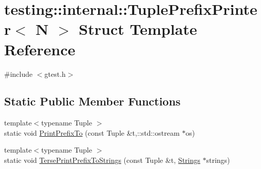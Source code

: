 \hypertarget{structtesting_1_1internal_1_1_tuple_prefix_printer}{\section{testing\-:\-:internal\-:\-:Tuple\-Prefix\-Printer$<$ N $>$ Struct Template Reference}
\label{structtesting_1_1internal_1_1_tuple_prefix_printer}
}


{\ttfamily \#include $<$gtest.\-h$>$}

\subsection*{Static Public Member Functions}
\begin{DoxyCompactItemize}
\item 
{\footnotesize template$<$typename Tuple $>$ }\\static void \hyperlink{structtesting_1_1internal_1_1_tuple_prefix_printer_ac8ea4f0f2604937a1e40370ef83d9d1b}{Print\-Prefix\-To} (const Tuple \&t,\-::std\-::ostream $\ast$os)
\item 
{\footnotesize template$<$typename Tuple $>$ }\\static void \hyperlink{structtesting_1_1internal_1_1_tuple_prefix_printer_afc57456f5cc2a08c11da53094c49dae1}{Terse\-Print\-Prefix\-To\-Strings} (const Tuple \&t, \hyperlink{namespacetesting_1_1internal_a7706b17f05f4b49e351b052ae4e05073}{Strings} $\ast$strings)
\end{DoxyCompactItemize}


